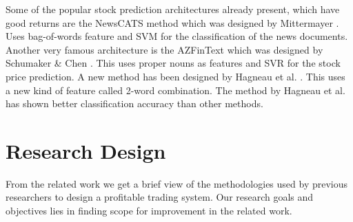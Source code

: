 \documentclass[review,twocolumn,5p]{elsarticle}
\begin{document}
Some of the popular stock prediction architectures already present, which have good returns are the NewsCATS method which was designed by Mittermayer \cite{1265201}. Uses bag-of-words feature and SVM for the classification of the news documents. Another very famous architecture is the AZFinText which was designed by Schumaker \& Chen \cite{Schumaker:2009}. This uses proper nouns as features and SVR for the stock price prediction. A new method has been designed by Hagneau et al. \cite{Hagenau:2013}. This uses a new kind of feature called 2-word combination. The method by Hagneau et al. has shown better classification accuracy than other methods.

\section{Research Design}
\label{sec:research-design}

From the related work we get a brief view of the methodologies used by previous researchers to design a profitable trading system. Our research goals and objectives lies in finding scope for improvement in the related work. 
\end{document}
